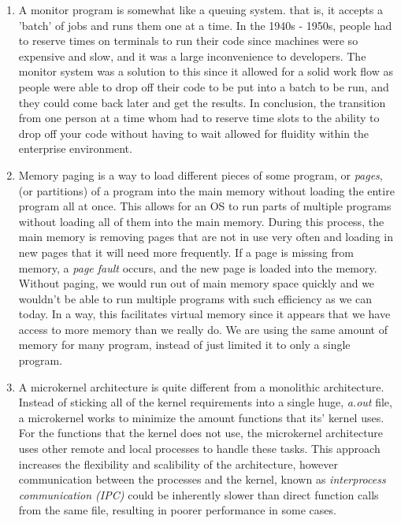 \documentclass[12pt]{article}
\begin{document}
\begin{enumerate}
	\item A monitor program is somewhat like a queuing system. that is, it accepts a 			'batch' of jobs and runs them one at a time. In the 1940s - 1950s, people had to 			reserve times on terminals to run their code since machines were so expensive and 			slow, and it was a large inconvenience to developers. The monitor system was a 				solution to this since it allowed for a solid work flow as people were able to drop 		off their code to be put into a batch to be run, and they could come back later and 		get the results. In conclusion, the transition from one person at a time whom had 			to reserve time slots to the ability to drop off your code without having to wait 			allowed for fluidity within the enterprise environment.

	\item Memory paging is a way to load different pieces of some program, or \textit{pages}, (or partitions) of a program into the main memory without loading the entire program all at once.	This allows for an OS to run parts of multiple programs without loading all of them into the main memory. During this process, the main memory is removing pages that are not in use very often and loading in new pages that it will need more frequently. If a page is missing from memory, a \textit{page fault} occurs, and the new page is loaded into the memory. Without paging, we would run out of main memory space quickly and we wouldn't be able to run multiple programs with such efficiency as we can today. In a way, this facilitates virtual memory since it appears that we have access to more memory than we really do. We are using the same amount of memory for many program, instead of just limited it to only a single program.

	\item A microkernel architecture is quite different from a monolithic architecture. Instead of sticking all of the kernel requirements into a single huge, \textit{a.out} file, a microkernel works to minimize the amount functions that its' kernel uses. For the functions that the kernel does not use, the microkernel architecture uses other remote and local processes to handle these tasks. This approach increases the flexibility and scalibility of the architecture, however communication between the processes and the kernel, known as \textit{interprocess communication (IPC)} could be inherently slower than direct function calls from the same file, resulting in poorer performance in some cases.

\end{enumerate}
	
\end{document}
